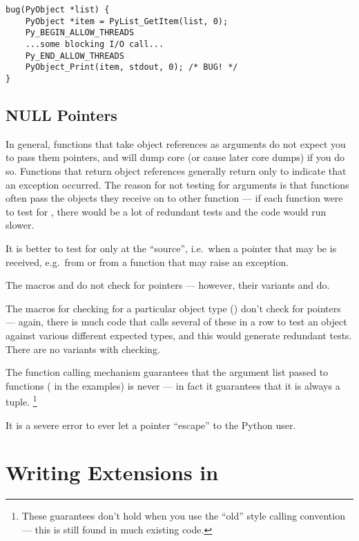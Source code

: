 \documentclass{manual}
\begin{document}
\begin{verbatim}
bug(PyObject *list) {
    PyObject *item = PyList_GetItem(list, 0);
    Py_BEGIN_ALLOW_THREADS
    ...some blocking I/O call...
    Py_END_ALLOW_THREADS
    PyObject_Print(item, stdout, 0); /* BUG! */
}
\end{verbatim}

\subsection{NULL Pointers}
\label{nullPointers}

In general, functions that take object references as arguments do not
expect you to pass them \NULL{} pointers, and will dump core (or
cause later core dumps) if you do so.  Functions that return object
references generally return \NULL{} only to indicate that an
exception occurred.  The reason for not testing for \NULL{}
arguments is that functions often pass the objects they receive on to
other function --- if each function were to test for \NULL{},
there would be a lot of redundant tests and the code would run slower.

It is better to test for \NULL{} only at the ``source'', i.e.\
when a pointer that may be \NULL{} is received, e.g.\ from
 or from a function that may raise an exception.

The macros  and 
do not check for \NULL{} pointers --- however, their variants
 and  do.

The macros for checking for a particular object type
() don't check for \NULL{} pointers ---
again, there is much code that calls several of these in a row to test
an object against various different expected types, and this would
generate redundant tests.  There are no variants with \NULL{}
checking.

The \C{} function calling mechanism guarantees that the argument list
passed to \C{} functions (\code{args} in the examples) is never
\NULL{} --- in fact it guarantees that it is always a tuple.%
\footnote{These guarantees don't hold when you use the ``old'' style
calling convention --- this is still found in much existing code.}

It is a severe error to ever let a \NULL{} pointer ``escape'' to
the Python user.  


\section{Writing Extensions in \Cpp{}}
\label{cplusplus}
\end{document}
